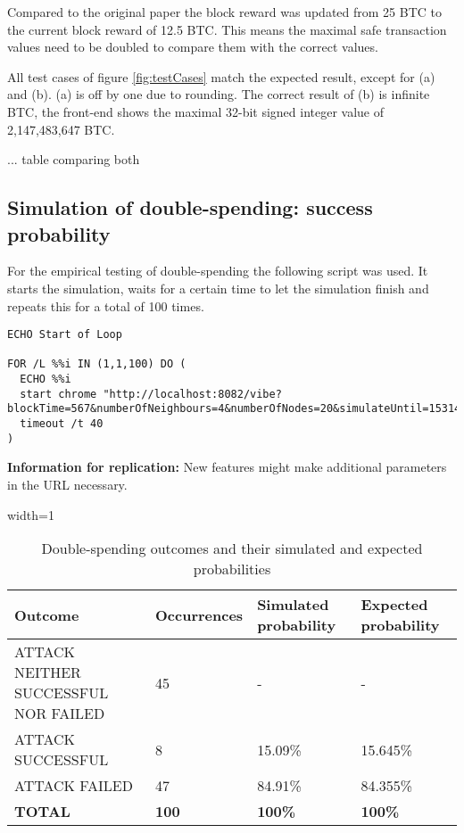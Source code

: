 Compared to the original paper the block reward was updated from 25 BTC to the current block reward of 12.5 BTC. This means the maximal safe transaction values need to be doubled to compare them with the correct values.\newline

All test cases of figure \ref{fig:testCases} match the expected result, except for (a) and (b). (a) is off by one due to rounding. The correct result of (b) is infinite BTC, the front-end shows the maximal 32-bit signed integer value of 2,147,483,647 BTC.

... table comparing both

\subsection{Simulation of double-spending: success probability}
\label{subsection:evalDoubleSpending}

For the empirical testing of double-spending the following script was used. It starts the simulation, waits for a certain time to let the simulation finish and repeats this for a total of 100 times.

\begin{minipage}{\linewidth}
\begin{lstlisting}[style=batch]
ECHO Start of Loop

FOR /L %%i IN (1,1,100) DO (
  ECHO %%i
  start chrome "http://localhost:8082/vibe?blockTime=567&numberOfNeighbours=4&numberOfNodes=20&simulateUntil=1531411943382&transactionSize=1&throughput=105&latency=900&neighboursDiscoveryInterval=3000&maxBlockSize=100&maxBlockWeight=4000&networkBandwidth=1&strategy=BITCOIN_LIKE_BLOCKCHAIN&transactionPropagationDelay=150&hashRate=30&confirmations=6"
  timeout /t 40
)
\end{lstlisting}
\end{minipage}

\textbf{Information for replication:} New features might make additional parameters in the URL necessary.

\begin{table}[ht]

\begin{adjustbox}{width=1\textwidth}
    \begin{tabular}{| l | l | l | l |}
    \hline
    \textbf{Outcome} & \textbf{Occurrences} & \textbf{Simulated probability} & \textbf{Expected probability} \\ \hline
    ATTACK NEITHER SUCCESSFUL NOR FAILED & 45 & - & - \\ \hline
    ATTACK SUCCESSFUL & 8 & 15.09\% & 15.645\% \\ \hline
    ATTACK FAILED & 47 & 84.91\% & 84.355\% \\ \hline
    \textbf{TOTAL} & \textbf{100} & \textbf{100\%} & \textbf{100\%} \\ \hline
    \end{tabular}
\end{adjustbox}
    \caption{Double-spending outcomes and their simulated and expected probabilities\label{table:doubleSpendingSimulatedAndExpected}}
\end{table} 

